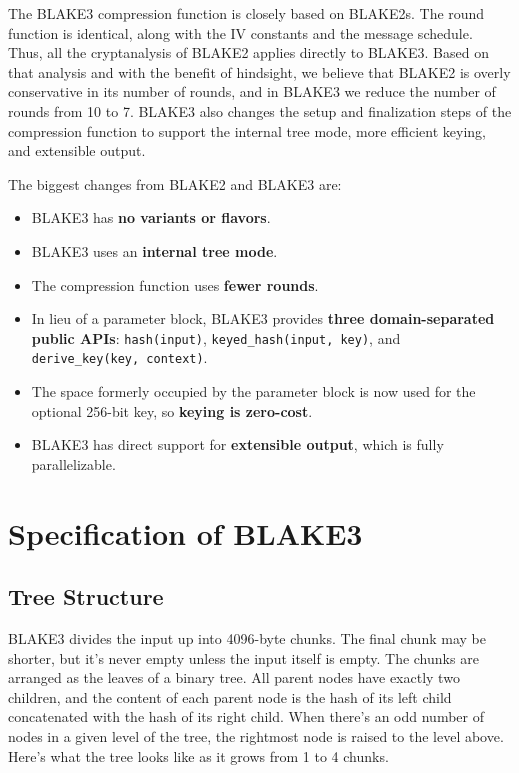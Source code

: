 \documentclass[11pt,notitlepage,a4paper]{article}
\begin{document}
The BLAKE3 compression function is closely based on BLAKE2s. The round function
is identical, along with the IV constants and the message schedule. Thus, all
the cryptanalysis of BLAKE2 applies directly to BLAKE3. Based on that analysis
and with the benefit of hindsight, we believe that BLAKE2 is overly
conservative in its number of rounds, and in BLAKE3 we reduce the number of
rounds from 10 to 7. BLAKE3 also changes the setup and finalization steps of
the compression function to support the internal tree mode, more efficient
keying, and extensible output.

The biggest changes from BLAKE2 and BLAKE3 are:

\begin{itemize}
    \item BLAKE3 has \textbf{no variants or flavors}.
    \item BLAKE3 uses an \textbf{internal tree mode}.
    \item The compression function uses \textbf{fewer rounds}.
    \item In lieu of a parameter block, BLAKE3 provides \textbf{three
        domain-separated public APIs}: \texttt{hash(input)},
        \texttt{keyed\_hash(input, key)}, and \texttt{derive\_key(key,
        context)}.
    \item The space formerly occupied by the parameter block is now used for
        the optional 256-bit key, so \textbf{keying is zero-cost}.
    \item BLAKE3 has direct support for \textbf{extensible output}, which is
        fully parallelizable.
\end{itemize}

\nocite{DBLP:journals/iacr/AumassonNWW13,DBLP:journals/rfc/rfc7693,DBLP:journals/tosc/LuykxMN16}

\section{Specification of BLAKE3}\label{sec:specification}

\subsection{Tree Structure}\label{sec:tree}

BLAKE3 divides the input up into 4096-byte chunks. The final chunk may be shorter, but it's never empty unless the input itself is empty. The chunks are arranged as the leaves of a binary tree. All parent nodes have exactly two children, and the content of each parent node is the hash of its left child concatenated with the hash of its right child. When there's an odd number of nodes in a given level of the tree, the rightmost node is raised to the level above. Here's what the tree looks like as it grows from 1 to 4 chunks.
\end{document}
